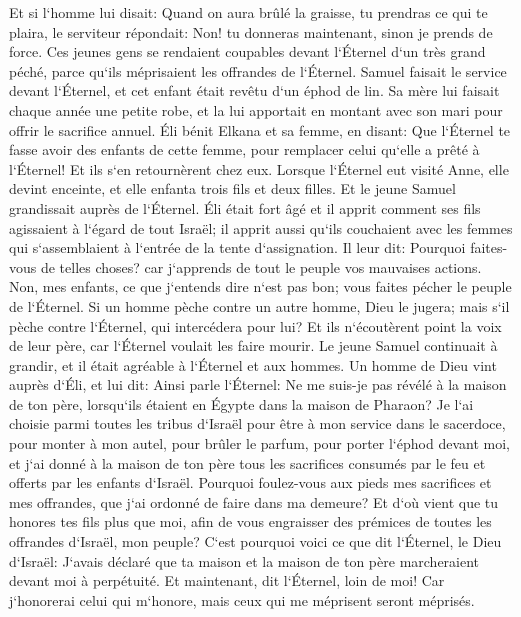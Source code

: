 \verse Et si l`homme lui disait: Quand on aura brûlé la graisse, tu prendras ce qui te plaira, le serviteur répondait: Non! tu donneras maintenant, sinon je prends de force. 
\verse Ces jeunes gens se rendaient coupables devant l`Éternel d`un très grand péché, parce qu`ils méprisaient les offrandes de l`Éternel. 
\verse Samuel faisait le service devant l`Éternel, et cet enfant était revêtu d`un éphod de lin. 
\verse Sa mère lui faisait chaque année une petite robe, et la lui apportait en montant avec son mari pour offrir le sacrifice annuel. 
\verse Éli bénit Elkana et sa femme, en disant: Que l`Éternel te fasse avoir des enfants de cette femme, pour remplacer celui qu`elle a prêté à l`Éternel! Et ils s`en retournèrent chez eux. 
\verse Lorsque l`Éternel eut visité Anne, elle devint enceinte, et elle enfanta trois fils et deux filles. Et le jeune Samuel grandissait auprès de l`Éternel. 
\verse Éli était fort âgé et il apprit comment ses fils agissaient à l`égard de tout Israël; il apprit aussi qu`ils couchaient avec les femmes qui s`assemblaient à l`entrée de la tente d`assignation. 
\verse Il leur dit: Pourquoi faites-vous de telles choses? car j`apprends de tout le peuple vos mauvaises actions. 
\verse Non, mes enfants, ce que j`entends dire n`est pas bon; vous faites pécher le peuple de l`Éternel. 
\verse Si un homme pèche contre un autre homme, Dieu le jugera; mais s`il pèche contre l`Éternel, qui intercédera pour lui? Et ils n`écoutèrent point la voix de leur père, car l`Éternel voulait les faire mourir. 
\verse Le jeune Samuel continuait à grandir, et il était agréable à l`Éternel et aux hommes. 
\verse Un homme de Dieu vint auprès d`Éli, et lui dit: Ainsi parle l`Éternel: Ne me suis-je pas révélé à la maison de ton père, lorsqu`ils étaient en Égypte dans la maison de Pharaon? 
\verse Je l`ai choisie parmi toutes les tribus d`Israël pour être à mon service dans le sacerdoce, pour monter à mon autel, pour brûler le parfum, pour porter l`éphod devant moi, et j`ai donné à la maison de ton père tous les sacrifices consumés par le feu et offerts par les enfants d`Israël. 
\verse Pourquoi foulez-vous aux pieds mes sacrifices et mes offrandes, que j`ai ordonné de faire dans ma demeure? Et d`où vient que tu honores tes fils plus que moi, afin de vous engraisser des prémices de toutes les offrandes d`Israël, mon peuple? 
\verse C`est pourquoi voici ce que dit l`Éternel, le Dieu d`Israël: J`avais déclaré que ta maison et la maison de ton père marcheraient devant moi à perpétuité. Et maintenant, dit l`Éternel, loin de moi! Car j`honorerai celui qui m`honore, mais ceux qui me méprisent seront méprisés. 
